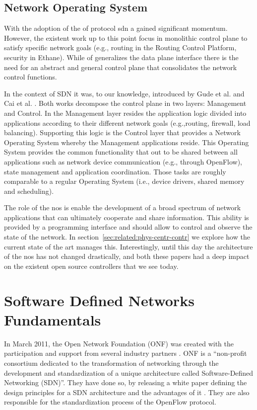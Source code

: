 \subsection{Network Operating System}
\glsresetall
\label{sec:related:netw-oper-syst}
With the adoption of the \gls{of} protocol \gls{sdn} a gained significant momentum. 
However, the existent work up to this point focus in monolithic control plane to satisfy specific network goals (e.g., routing in the Routing Control Platform, security in Ethane). 
While \gls{of} generalizes the data plane interface there is  the need for an abstract and general control plane that consolidates the network control functions. 

In the context of SDN it was, to our knowledge, introduced by Gude et al. \cite{Gude:2008jd} and Cai et al. \cite{Z.-Cai:2008fk}.
Both works decompose the control plane in two layers: Management and Control. 
In the Management layer resides the application logic divided into applications according to their different network goals (e.g.,routing, firewall, load balancing). 
Supporting this logic is the Control layer that provides a Network Operating System whereby the Management applications reside. 
This Operating System provides the common functionality that out to be shared between all applications such as network device communication (e.g., through OpenFlow), state management and application coordination. 
Those tasks are roughly comparable to a regular Operating System (i.e., device drivers, shared memory and scheduling). 


The role of the \gls{nos} is enable the development of a broad spectrum of network applications that can ultimately cooperate and share information. This ability is provided by a programming interface and should allow to control and observe the state of the network. 
In section~\ref{sec:related:phys-centr-contr} we explore how the current state of the art manages this. 
Interestingly, until this day the architecture of the \gls{nos} has not changed drastically, and both these papers had a deep impact on the existent open source controllers that we see today. 
\glsresetall

\section{Software Defined Networks Fundamentals}
\glsresetall
\label{sec:realted:softw-defin-netw}


In March 2011, the Open Network Foundation (ONF) was created with the participation and support from several industry partners \cite{onf}. 
ONF  is a ``non-profit consortium dedicated to the transformation of networking through the development and standardization of a unique architecture called Software-Defined Networking (SDN)''. 
They have done so, by releasing a white paper defining the design principles for a SDN architecture and the advantages of it \cite{ONF:2012ui}. 
They are also responsible for the standardization process of the OpenFlow protocol.

